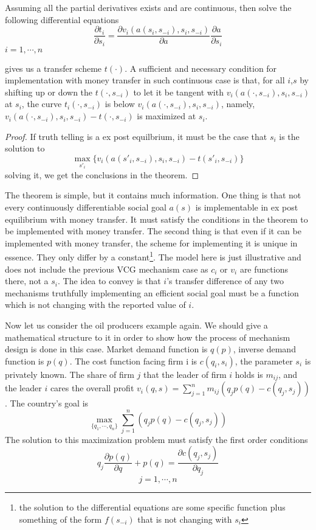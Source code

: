 \begin{thm}
Assuming all the partial derivatives exists and are continuous, then solve the following 
differential equations
 $$\frac{\partial t_i}{\partial s_i} = \frac{\partial v_i(a(s_i,s_{-i}),s_i,s_{-i})}{\partial a } \frac{\partial a}{\partial s_i}$$
 $i=1,\cdots,n$ 
 
 gives us a transfer scheme $t(\cdot)$.
A sufficient and necessary condition for implementation with money transfer in such continuous case is that, for all $i$,$s$
by shifting up or down the $t(\cdot,s_{-i})$ to let it be tangent with $ v_i(a(\cdot,s_{-i}),s_i,s_{-i})$ at $s_i$, the curve
$t_i(\cdot,s_{-i})$ is below $ v_i(a(\cdot,s_{-i}),s_i,s_{-i})$, namely, $v_i(a(\cdot,s_{-i}),s_i,s_{-i})-t(\cdot,s_{-i})$ is
maximized at $s_i$.

 
\end{thm}
\begin{proof}
 If truth telling is a ex post equilbrium, it must be the case that $s_i$ is the solution to
 $$\max_{s'_i} \{v_i(a(s'_i,s_{-i}),s_i,s_{-i})-t(s'_i,s_{-i})\}$$
 solving it, we get the conclusions in the theorem.
\end{proof}

The theorem is simple, but it contains much information. One thing is that not every continuously differentiable
social goal $a(s)$ is implementable in ex post equilibrium with money transfer. It must satisfy the conditions in the theorem 
to be implemented with money transfer. The second thing is that even if it can be implemented with money transfer, the scheme for 
implementing it is unique in essence. They only differ by a constant\footnote{the solution to the differential equations are some specific
  function plus something of the form $f(s_{-i})$ that is not changing with $s_i$}. The model here is just illustrative and does not include
the previous VCG mechanism case as $c_i$ or $v_i$ are functions there, not a $s_i$. The idea to convey is that $i$'s transfer difference of any two mechanisms truthfully implementing an efficient social goal must be a function which is not changing with the reported value of $i$. 

Now let us consider the oil producers example again. We should give a mathematical structure to it in order to show how the process of mechanism
design is done in this case. Market demand function is $q(p)$, inverse demand function is $p(q)$. The cost function 
facing firm i is $c(q_i,s_i)$, the parameter $s_i$ is privately known. The share of firm $j$
that the leader of firm  $i$ holds is $m_{ij}$, and  the leader $i$ cares the overall profit 
$v_i(q,s)=\sum_{j=1}^{n} m_{ij}(q_jp(q)-c(q_j,s_j))$. The country's goal is 
$$\max_{\{q_1,\cdots,q_n\}}\sum_{j=1}^{n} (q_jp(q)-c(q_j,s_j)) $$
The solution to this maximization problem must satisfy the first order conditions
$$q_j \frac {\partial p(q)}{\partial q}+p(q)=\frac {\partial c(q_j,s_j)}{\partial q_j}$$
$$j=1,\cdots,n$$

